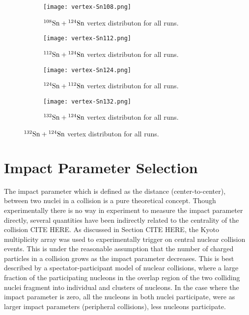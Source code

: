 \begin{figure}[!htb]
    \centering
    \begin{subfigure}[t]{\textwidth}
        \centering
        \texttt{[image: vertex-Sn108.png]} 
        \caption{${}^{108}\mathrm{Sn} + {}^{124}\mathrm{Sn}$ vertex distributon for all runs.} \label{fig:vertex108}
    \end{subfigure}
    \hfill
    \begin{subfigure}[t]{\textwidth}
        \centering
        \texttt{[image: vertex-Sn112.png]} 
        \caption{${}^{112}\mathrm{Sn} + {}^{124}\mathrm{Sn}$ vertex distributon for all runs.} \label{fig:vertex112}
    \end{subfigure}
    
    \begin{subfigure}[t]{\textwidth}
        \centering
        \texttt{[image: vertex-Sn124.png]} 
        \caption{${}^{124}\mathrm{Sn} + {}^{112}\mathrm{Sn}$ vertex distributon for all runs.} \label{fig:vertex124}
    \end{subfigure}
    \hfill
    \begin{subfigure}[t]{\textwidth}
        \centering
        \texttt{[image: vertex-Sn132.png]} 
        \caption{${}^{132}\mathrm{Sn} + {}^{124}\mathrm{Sn}$ vertex distributon for all runs.} \label{fig:vertex132}
    \end{subfigure}
\label{fig:vertexdist}
\end{figure}


\section{Impact Parameter Selection}
The impact parameter which is defined as the distance (center-to-center), between two nuclei in a collision is a pure theoretical concept. Though experimentally there is no way in experiment to measure the impact parameter directly, several quantities have been indirectly related to the centrality of the collision CITE HERE. As discussed in Section CITE HERE, the Kyoto multiplicity array was used to experimentally trigger on central nuclear collision events. This is under the reasonable assumption that the number of charged particles in a collision grows as the impact parameter decreases. This is best described by a spectator-participant model of nuclear collisions, where a large fraction of the participating nucleons in the overlap region of the two colliding nuclei fragment into individual and clusters of nucleons. In the case where the impact parameter is zero, all the nucleons in both nuclei participate, were as larger impact parameters (peripheral collisions), less nucleons participate. 

